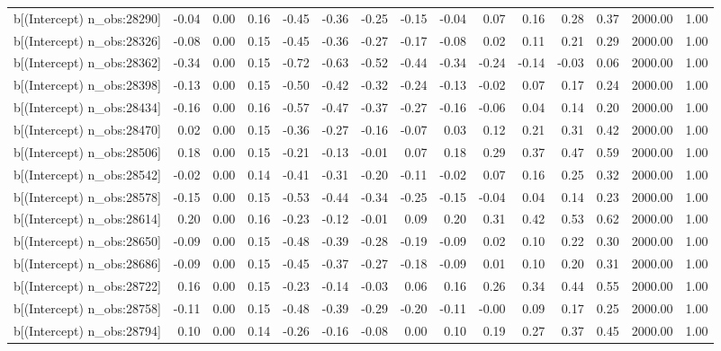 \begin{table}[ht]
\begin{tabular}{rrrrrrrrrrrrrrr}
  b[(Intercept) n\_obs:28290] & -0.04 & 0.00 & 0.16 & -0.45 & -0.36 & -0.25 & -0.15 & -0.04 & 0.07 & 0.16 & 0.28 & 0.37 & 2000.00 & 1.00 \\ 
  b[(Intercept) n\_obs:28326] & -0.08 & 0.00 & 0.15 & -0.45 & -0.36 & -0.27 & -0.17 & -0.08 & 0.02 & 0.11 & 0.21 & 0.29 & 2000.00 & 1.00 \\ 
  b[(Intercept) n\_obs:28362] & -0.34 & 0.00 & 0.15 & -0.72 & -0.63 & -0.52 & -0.44 & -0.34 & -0.24 & -0.14 & -0.03 & 0.06 & 2000.00 & 1.00 \\ 
  b[(Intercept) n\_obs:28398] & -0.13 & 0.00 & 0.15 & -0.50 & -0.42 & -0.32 & -0.24 & -0.13 & -0.02 & 0.07 & 0.17 & 0.24 & 2000.00 & 1.00 \\ 
  b[(Intercept) n\_obs:28434] & -0.16 & 0.00 & 0.16 & -0.57 & -0.47 & -0.37 & -0.27 & -0.16 & -0.06 & 0.04 & 0.14 & 0.20 & 2000.00 & 1.00 \\ 
  b[(Intercept) n\_obs:28470] & 0.02 & 0.00 & 0.15 & -0.36 & -0.27 & -0.16 & -0.07 & 0.03 & 0.12 & 0.21 & 0.31 & 0.42 & 2000.00 & 1.00 \\ 
  b[(Intercept) n\_obs:28506] & 0.18 & 0.00 & 0.15 & -0.21 & -0.13 & -0.01 & 0.07 & 0.18 & 0.29 & 0.37 & 0.47 & 0.59 & 2000.00 & 1.00 \\ 
  b[(Intercept) n\_obs:28542] & -0.02 & 0.00 & 0.14 & -0.41 & -0.31 & -0.20 & -0.11 & -0.02 & 0.07 & 0.16 & 0.25 & 0.32 & 2000.00 & 1.00 \\ 
  b[(Intercept) n\_obs:28578] & -0.15 & 0.00 & 0.15 & -0.53 & -0.44 & -0.34 & -0.25 & -0.15 & -0.04 & 0.04 & 0.14 & 0.23 & 2000.00 & 1.00 \\ 
  b[(Intercept) n\_obs:28614] & 0.20 & 0.00 & 0.16 & -0.23 & -0.12 & -0.01 & 0.09 & 0.20 & 0.31 & 0.42 & 0.53 & 0.62 & 2000.00 & 1.00 \\ 
  b[(Intercept) n\_obs:28650] & -0.09 & 0.00 & 0.15 & -0.48 & -0.39 & -0.28 & -0.19 & -0.09 & 0.02 & 0.10 & 0.22 & 0.30 & 2000.00 & 1.00 \\ 
  b[(Intercept) n\_obs:28686] & -0.09 & 0.00 & 0.15 & -0.45 & -0.37 & -0.27 & -0.18 & -0.09 & 0.01 & 0.10 & 0.20 & 0.31 & 2000.00 & 1.00 \\ 
  b[(Intercept) n\_obs:28722] & 0.16 & 0.00 & 0.15 & -0.23 & -0.14 & -0.03 & 0.06 & 0.16 & 0.26 & 0.34 & 0.44 & 0.55 & 2000.00 & 1.00 \\ 
  b[(Intercept) n\_obs:28758] & -0.11 & 0.00 & 0.15 & -0.48 & -0.39 & -0.29 & -0.20 & -0.11 & -0.00 & 0.09 & 0.17 & 0.25 & 2000.00 & 1.00 \\ 
  b[(Intercept) n\_obs:28794] & 0.10 & 0.00 & 0.14 & -0.26 & -0.16 & -0.08 & 0.00 & 0.10 & 0.19 & 0.27 & 0.37 & 0.45 & 2000.00 & 1.00 \\ 

\end{tabular}
\end{table}
